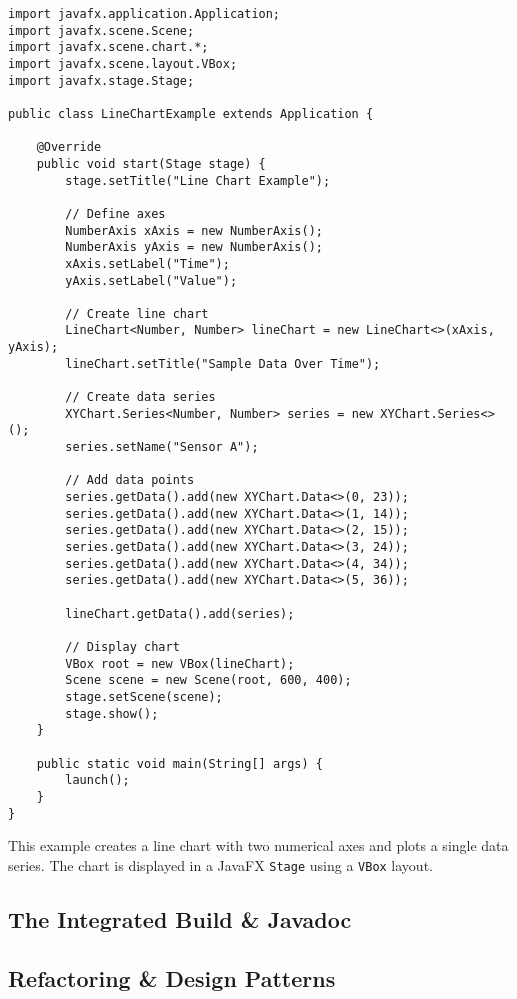 \documentclass{article}
\newcommand{\codecmd}[1]{\textcolor[rgb]{0,0.5,0}{\texttt{#1}}}
\begin{document}
\begin{verbatim}
import javafx.application.Application;
import javafx.scene.Scene;
import javafx.scene.chart.*;
import javafx.scene.layout.VBox;
import javafx.stage.Stage;

public class LineChartExample extends Application {

    @Override
    public void start(Stage stage) {
        stage.setTitle("Line Chart Example");

        // Define axes
        NumberAxis xAxis = new NumberAxis();
        NumberAxis yAxis = new NumberAxis();
        xAxis.setLabel("Time");
        yAxis.setLabel("Value");

        // Create line chart
        LineChart<Number, Number> lineChart = new LineChart<>(xAxis, yAxis);
        lineChart.setTitle("Sample Data Over Time");

        // Create data series
        XYChart.Series<Number, Number> series = new XYChart.Series<>();
        series.setName("Sensor A");

        // Add data points
        series.getData().add(new XYChart.Data<>(0, 23));
        series.getData().add(new XYChart.Data<>(1, 14));
        series.getData().add(new XYChart.Data<>(2, 15));
        series.getData().add(new XYChart.Data<>(3, 24));
        series.getData().add(new XYChart.Data<>(4, 34));
        series.getData().add(new XYChart.Data<>(5, 36));

        lineChart.getData().add(series);

        // Display chart
        VBox root = new VBox(lineChart);
        Scene scene = new Scene(root, 600, 400);
        stage.setScene(scene);
        stage.show();
    }

    public static void main(String[] args) {
        launch();
    }
}
\end{verbatim}

This example creates a line chart with two numerical axes and plots a single data series. The chart is displayed in a JavaFX \codecmd{Stage} using a \codecmd{VBox} layout.






\subsection{The Integrated Build \& Javadoc}

\subsection{Refactoring \& Design Patterns}
\end{document}
